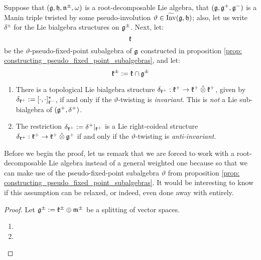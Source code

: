         \begin{theorem} \label{theorem: lie_bialgebras_from_invariantly_twisted_manin_triples}
            Suppose that $(\mathfrak{g}, \mathfrak{h}, \mathfrak{n}^{\pm}, \omega)$ is a root-decomposable Lie algebra, that $(\mathfrak{g}, \mathfrak{g}^+, \mathfrak{g}^-)$ is a Manin triple twisted by some pseudo-involution $\vartheta \in \widetilde{\operatorname{Inv}}(\mathfrak{g}, \mathfrak{h})$; also, let us write $\delta^{\pm}$ for the Lie bialgebra structures on $\mathfrak{g}^{\pm}$. Next, let:
                $$\mathfrak{k}$$
            be the $\vartheta$-pseudo-fixed-point subalgebra of $\mathfrak{g}$ constructed in proposition \ref{prop: constructing_pseudo_fixed_point_subalgebras}, and let:
                $$\mathfrak{k}^{\pm} := \mathfrak{k} \cap \mathfrak{g}^{\pm}$$
            \begin{enumerate}
                \item There is a topological Lie bialgebra structure $\delta_{\k^+}: \k^+ \to \k^+ \hattensor \k^+$, given by $\delta_{\mathfrak{k}^+} := [\cdot, \cdot]_{\mathfrak{k}^-}^*$, if and only if the $\vartheta$-twisting is \textit{invariant}. This is \textit{not} a Lie sub-bialgebra of $(\mathfrak{g}^+, \delta^+)$.
                \item The restriction $\delta_{\mathfrak{k}^+} := \delta^+|_{\mathfrak{k}^+}$ is a Lie right-coideal structure $\delta_{\k^+}: \k^+ \to \k^+ \hattensor \g^+$ if and only if the $\vartheta$-twisting is \textit{anti-invariant}.
            \end{enumerate}
        \end{theorem}
        \begin{remark}
            Before we begin the proof, let us remark that we are forced to work with a root-decomposable Lie algebra instead of a general weighted one because so that we can make use of the pseudo-fixed-point subalgebra $\vartheta$ from proposition \ref{prop: constructing_pseudo_fixed_point_subalgebras}. It would be interesting to know if this assumption can be relaxed, or indeed, even done away with entirely.
        \end{remark}
            \begin{proof}
                Let $\mathfrak{g}^{\pm} := \mathfrak{k}^{\pm} \oplus \mathfrak{m}^{\pm}$ be a splitting of vector spaces.
                \begin{enumerate}
                    \item 
                    \item 
                \end{enumerate}
            \end{proof}

